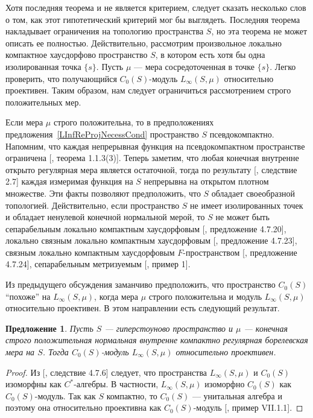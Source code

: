 \documentclass[12pt]{article}
\newtheorem{proposition}[theorem]{Предложение}
\begin{document}
Хотя последняя теорема и не является критерием, следует сказать несколько слов о
том, как этот гипотетический критерий мог бы выглядеть. Последняя теорема
накладывает ограничения на топологию пространства $S$, но эта теорема не может
описать ее полностью. Действительно, рассмотрим произвольное локально компактное
хаусдорфово пространство $S$, в котором есть хотя бы одна изолированная точка
$\{s\}$. Пусть $\mu$ --- мера сосредоточенная в точке $\{s\}$. Легко проверить,
что получающийся $C_0(S)$-модуль $L_\infty(S,\mu)$ относительно проективен.
Таким образом, нам следует ограничиться рассмотрением строго положительных мер.

Если мера $\mu$ строго положительна, то в предположениях
предложения~\ref{LInfReProjNecessCond} пространство $S$ псевдокомпактно.
Напомним, что каждая непрерывная функция на псевдокомпактном пространстве
ограничена [\cite{HrusPseudCompTopSp}, теорема 1.1.3(3)]. Теперь заметим, что
любая конечная внутренне открыто регулярная мера является остаточной, тогда по
результату [\cite{ZindResMeasLocCompSp}, следствие 2.7] каждая измеримая функция
на $S$ непрерывна на открытом плотном множестве. Эти факты позволяют
предположить, что $S$ обладает своеобразной топологией. Действительно, если
пространство $S$ не имеет изолированных точек и обладает ненулевой конечной
нормальной мерой, то $S$ не может быть сепарабельным локально компактным
хаусдорфовым [\cite{DalesBanSpContFunDualSp}, предложение 4.7.20], локально
связным локально компактным хаусдорфовым [\cite{DalesBanSpContFunDualSp},
предложение 4.7.23], связным локально компактным хаусдорфовым $F$-пространством
[\cite{DalesBanSpContFunDualSp}, предложение 4.7.24], сепарабельным метризуемым
[\cite{FlachNormMeasTopSp}, пример 1].

Из предыдущего обсуждения заманчиво предположить, что пространство $C_0(S)$
``похоже'' на  $L_\infty(S,\mu)$, когда мера $\mu$ строго положительна и модуль
$L_\infty(S,\mu)$ относительно проективен. В этом направлении есть следующий
результат.

\begin{proposition}\label{LInfReProjSuffCond} Пусть $S$ --- гиперстоуново
    пространство и $\mu$ --- конечная строго положительная нормальная внутренне
    компактно регулярная борелевская мера на $S$. Тогда $C_0(S)$-модуль
    $L_\infty(S,\mu)$ относительно проективен.
\end{proposition}
\begin{proof} Из [\cite{DalesBanSpContFunDualSp}, следствие 4.7.6] следует, что
    пространства $L_\infty(S,\mu)$ и $C_0(S)$ изоморфны как $C^*$-алгебры. В
    частности, $L_\infty(S,\mu)$ изоморфно $C_0(S)$ как $C_0(S)$-модуль. Так как
    $S$ компактно, то $C_0(S)$ --- унитальная алгебра и поэтому она относительно
    проективна как $C_0(S)$-модуль [\cite{HelBanLocConvAlg}, пример VII.1.1].
\end{proof}
\end{document}
